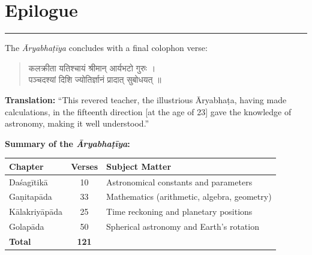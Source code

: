 \documentclass[11pt,a4paper]{article}
\newcommand{\dev}[1]{{\devanagarifont #1}}
\newenvironment{sanskritverse}{\begin{verse}\devanagarifont\large\centering}{\end{verse}}
\begin{document}
\clearpage

\section*{Epilogue}

\begin{center}
\textcolor{rulecolor}{\rule{0.8\textwidth}{0.6pt}}
\end{center}

\vspace{0.3cm}

\noindent
The \textit{Āryabhaṭīya} concludes with a final colophon verse:

\vspace{0.3cm}

\begin{tcolorbox}[colback=gray!10,colframe=sectioncolor]
\begin{sanskritverse}
\dev{\Large
कलक्रीता यतिश्चायं श्रीमान् आर्यभटो गुरुः ।\\
पञ्चदश्यां दिशि ज्योतिर्ज्ञानं प्रादात् सुबोधयत् ॥}
\end{sanskritverse}
\end{tcolorbox}

\vspace{0.3cm}
\noindent\textbf{Translation:} ``This revered teacher, the illustrious Āryabhaṭa, having made calculations, in the fifteenth direction [at the age of 23] gave the knowledge of astronomy, making it well understood.''

\vspace{0.5cm}

\noindent
\textbf{Summary of the \textit{Āryabhaṭīya}:}

\begin{center}
\begin{tabular}{|l|c|l|}
\hline
\textbf{Chapter} & \textbf{Verses} & \textbf{Subject Matter} \\
\hline
Daśagītikā & 10 & Astronomical constants and parameters \\
Gaṇitapāda & 33 & Mathematics (arithmetic, algebra, geometry) \\
Kālakriyāpāda & 25 & Time reckoning and planetary positions \\
Golapāda & 50 & Spherical astronomy and Earth's rotation \\
\hline
\textbf{Total} & \textbf{121} & \\
\hline
\end{tabular}
\end{center}
\end{document}
